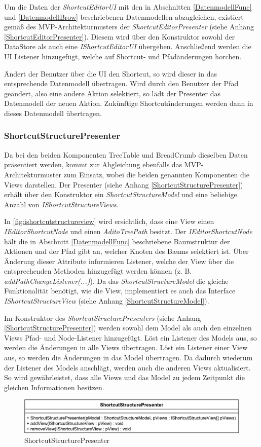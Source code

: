 Um die Daten der \emph{ShortcutEditorUI} mit den in Abschnitten \ref{DatenmodellFunc} und \ref{DatenmodellBrow} beschriebenen Datenmodellen abzugleichen, existiert gemäß des MVP-Architekturmusters der \emph{ShortcutEditorPresenter} (siehe Anhang \ref{ShortcutEditorPresenter}). Diesem wird über den Konstruktor sowohl der DataStore als auch eine \emph{IShortcutEditorUI} übergeben. Anschließend werden die UI Listener hinzugefügt, welche auf Shortcut- und Pfadänderungen horchen.

Ändert der Benutzer über die UI den Shortcut, so wird dieser in das entsprechende Datenmodell übertragen. Wird durch den Benutzer der Pfad geändert, also eine andere Aktion selektiert, so lädt der Presenter das Datenmodell der neuen Aktion. Zukünftige Shortcutänderungen werden dann in dieses Datenmodell übertragen.

\subsubsection{ShortcutStructurePresenter}

Da bei den beiden Komponenten TreeTable und BreadCrumb dieselben Daten präsentiert werden, kommt zur Abgleichung ebenfalls das MVP-Architekturmuster zum Einsatz, wobei die beiden genannten Komponenten die Views darstellen. Der Presenter (siehe Anhang \ref{ShortcutStructurePresenter}) erhält über den Konstruktor ein \emph{ShortcutStructureModel} und eine beliebige Anzahl von \emph{IShortcutStructureViews}. 

In \autoref{fig:ishortcutstructureview} wird ersichtlich, dass eine View einen \emph{IEditorShortcutNode} und einen \emph{AditoTreePath} besitzt. Der \emph{IEditorShortcutNode} hält die in Abschnitt \ref{DatenmodellFunc} beschriebene Baumstruktur der Aktionen und der Pfad gibt an, welcher Knoten des Baums selektiert ist. Über Änderung dieser Attribute informieren Listener, welche der View über die entsprechenden Methoden hinzugefügt werden können (z. B. \emph{addPathChangeListener(...)}). Da das \emph{ShortcutStructureModel} die gleiche Funktionalität benötigt, wie die View, implementiert es auch das Interface \emph{IShortcutStructureView} (siehe Anhang \ref{ShortcutStructureModel}).

Im Konstruktor des \emph{ShortcutStructurePresenters} (siehe Anhang \ref{ShortcutStructurePresenter}) werden sowohl dem Model als auch den einzelnen Views Pfad- und Node-Listener hinzugefügt. Löst ein Listener des Models aus, so werden die Änderungen in alle Views übertragen. Löst ein Listener einer View aus, so werden die Änderungen in das Model übertragen. Da dadurch wiederum der Listener des Models anschlägt, werden auch die anderen Views aktualisiert. So wird gewährleistet, dass alle Views und das Model zu jedem Zeitpunkt die gleichen Informationen besitzen.

\begin{figure}[H]
	\centering
	\includegraphics[width=0.6\linewidth]{../graphic/diagrams/CD_ShortcutStructurePresenter/ShortcutStructurePresenter}
	\caption{ShortcutStructurePresenter}
	\label{fig:shortcutstructurepresenter}
\end{figure}

\newpage